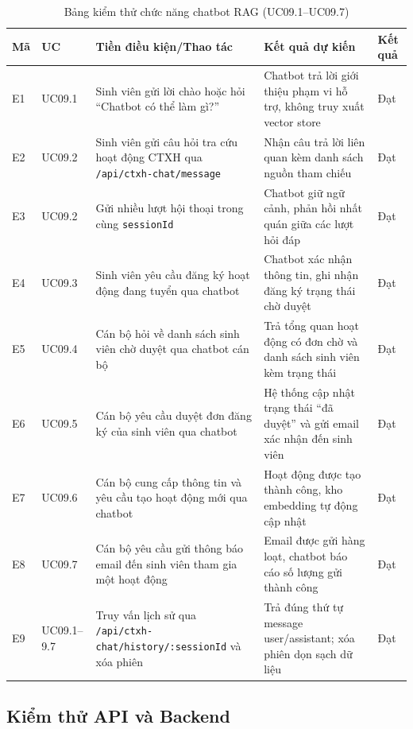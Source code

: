 \begin{table}[H]
\centering
\renewcommand{\arraystretch}{1.2}
\small
\begin{tabular}{|p{1.2cm}|p{1.8cm}|p{4.0cm}|p{4.2cm}|p{2.5cm}|}
\hline
\textbf{Mã} & \textbf{UC} & \textbf{Tiền điều kiện/Thao tác} & \textbf{Kết quả dự kiến} & \textbf{Kết quả} \\
\hline
E1 & UC09.1 & Sinh viên gửi lời chào hoặc hỏi ``Chatbot có thể làm gì?'' & Chatbot trả lời giới thiệu phạm vi hỗ trợ, không truy xuất vector store & Đạt \\
\hline
E2 & UC09.2 & Sinh viên gửi câu hỏi tra cứu hoạt động CTXH qua \texttt{/api/ctxh-chat/message} & Nhận câu trả lời liên quan kèm danh sách nguồn tham chiếu & Đạt \\
\hline
E3 & UC09.2 & Gửi nhiều lượt hội thoại trong cùng \texttt{sessionId} & Chatbot giữ ngữ cảnh, phản hồi nhất quán giữa các lượt hỏi đáp & Đạt \\
\hline
E4 & UC09.3 & Sinh viên yêu cầu đăng ký hoạt động đang tuyển qua chatbot & Chatbot xác nhận thông tin, ghi nhận đăng ký trạng thái chờ duyệt & Đạt \\
\hline
E5 & UC09.4 & Cán bộ hỏi về danh sách sinh viên chờ duyệt qua chatbot cán bộ & Trả tổng quan hoạt động có đơn chờ và danh sách sinh viên kèm trạng thái & Đạt \\
\hline
E6 & UC09.5 & Cán bộ yêu cầu duyệt đơn đăng ký của sinh viên qua chatbot & Hệ thống cập nhật trạng thái ``đã duyệt'' và gửi email xác nhận đến sinh viên & Đạt \\
\hline
E7 & UC09.6 & Cán bộ cung cấp thông tin và yêu cầu tạo hoạt động mới qua chatbot & Hoạt động được tạo thành công, kho embedding tự động cập nhật & Đạt \\
\hline
E8 & UC09.7 & Cán bộ yêu cầu gửi thông báo email đến sinh viên tham gia một hoạt động & Email được gửi hàng loạt, chatbot báo cáo số lượng gửi thành công & Đạt \\
\hline
E9 & UC09.1--9.7 & Truy vấn lịch sử qua \texttt{/api/ctxh-chat/history/:sessionId} và xóa phiên & Trả đúng thứ tự message user/assistant; xóa phiên dọn sạch dữ liệu & Đạt \\
\hline
\end{tabular}
\caption{Bảng kiểm thử chức năng chatbot RAG (UC09.1--UC09.7)}
\end{table}

\subsection{Kiểm thử API và Backend}


